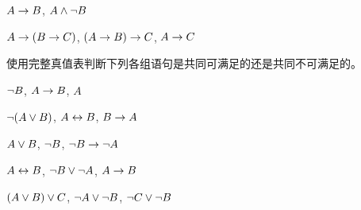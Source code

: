 \begin{compactlist}
%
%


\item $A \rightarrow B$, $A \wedge \neg B$\vspace{.5ex} %

\item $A \rightarrow (B \rightarrow C)$, $(A \rightarrow B) \rightarrow C$, $A \rightarrow C$\vspace{.5ex} %

\end{compactlist}

\noindent\problempart
\label{pr.TT.satisfiable3}
使用完整真值表判断下列各组语句是共同可满足的还是共同不可满足的。


\begin{compactlist}
\item $\neg B$, $A \rightarrow B$, $A$ \vspace{.5ex}%
\item $\neg(A \vee B)$, $A \leftrightarrow B$, $B \rightarrow A$\vspace{.5ex} %
\item $A \vee B$, $\neg B$, $\neg B \rightarrow \neg A$\vspace{.5ex} %
\item $A \leftrightarrow B$, $\neg B \vee \neg A$, $A \rightarrow B$\vspace{.5ex} %
\item $(A \vee B) \vee C$, $\neg A \vee \neg B$, $\neg C \vee \neg B$\vspace{.5ex} %
\end{compactlist}

